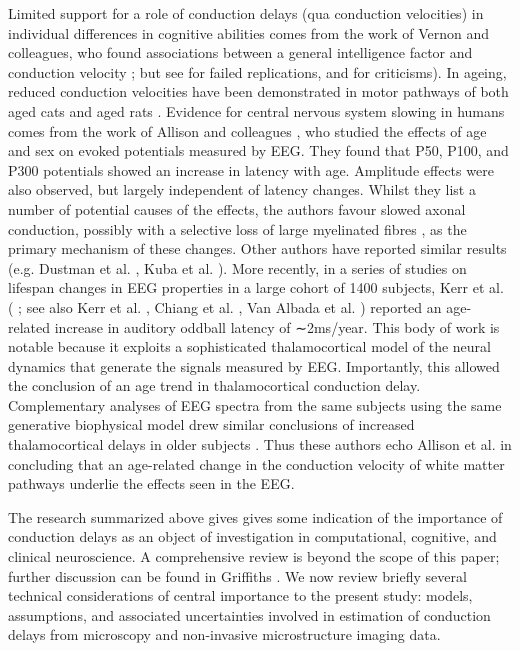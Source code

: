 Limited support for a role of conduction delays (qua conduction velocities) in individual differences in cognitive abilities comes from the work of Vernon and colleagues, who found associations between a general intelligence factor and conduction velocity  \cite{mcrorie2004synaptic,reed2004confirmation,reed1991arm,reed1992conduction,reed1993a,vernon1983speed,vernon1992intelligence} ; but see \cite{wickett1994peripheral} for failed replications, and  \cite{saintamour2005can} for criticisms). In ageing, reduced conduction velocities have been demonstrated in motor pathways of both aged cats \cite{morales1987basic,xi1999changes} and aged rats \cite{astonjones1980brain}. Evidence for central nervous system slowing in humans comes from the work of Allison and colleagues \cite{allison1984developmental,allison1983brain}, who studied the effects of age and sex on evoked potentials measured by EEG. They found that P50, P100, and P300 potentials showed an increase in latency with age.  Amplitude effects were also observed, but largely independent of latency changes. Whilst they list a number of potential causes of the effects, the authors favour slowed axonal conduction, possibly with a selective loss of large myelinated fibres \cite{morrison1990aging}, as the primary mechanism of these changes. Other authors have reported similar results (e.g. Dustman et al. \cite{dustman1990age}, Kuba et al. ). More recently, in a series of studies on lifespan changes in EEG properties in a large cohort of 1400 subjects, Kerr et al. (\cite{kerr2010age} 
; see also Kerr et al. \cite{kerr2011modelbased}, Chiang et al. \cite{chiang2011age}, Van Albada et al. \cite{vanalbada2010neurophysiological}) reported an age-related increase in auditory oddball latency of ∼2ms/year. This body of work is notable because it exploits a sophisticated thalamocortical model of the neural dynamics that generate the signals measured by EEG. Importantly, this allowed the conclusion of an age trend in thalamocortical conduction delay. Complementary analyses of EEG spectra from the same subjects using the same generative biophysical model drew similar conclusions of increased thalamocortical delays in older subjects \cite{vanalbada2010neurophysiological}. Thus these authors echo Allison et al.  \cite{allison1984developmental} in concluding that an age-related change in the conduction velocity of white matter pathways underlie the effects seen in the EEG. 

The research summarized above gives gives some indication of the importance of conduction delays as an object of investigation in computational, cognitive, and clinical neuroscience. A comprehensive review is beyond the scope of this paper; further discussion can be found in Griffiths \cite{griffiths2014the}. We now review briefly several technical considerations of central importance to the present study: models, assumptions, and associated uncertainties involved in estimation of conduction delays from microscopy and non-invasive microstructure imaging data.